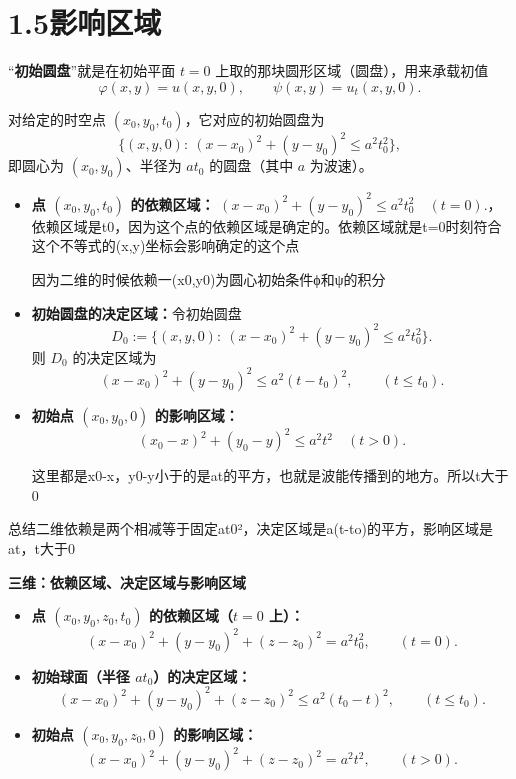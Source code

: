 \section{1.5影响区域}  
\begin{dxtips}
    “\textbf{初始圆盘}”就是在初始平面 $t=0$ 上取的那块圆形区域（圆盘），用来承载初值
\[
\varphi(x,y)=u(x,y,0),\qquad \psi(x,y)=u_t(x,y,0).
\]

对给定的时空点 $(x_0,y_0,t_0)$，它对应的初始圆盘为
\[
\{(x,y,0):\ (x-x_0)^2+(y-y_0)^2\le a^2t_0^2\},
\]
即圆心为 $(x_0,y_0)$、半径为 $a t_0$ 的圆盘（其中 $a$ 为波速）。
\end{dxtips}
\begin{itemize}
  \item \textbf{点 $(x_0,y_0,t_0)$ 的依赖区域：}
  $
  (x-x_0)^2+(y-y_0)^2\le a^2t_0^2 \quad (t=0). 
  $，依赖区域是t0，因为这个点的依赖区域是确定的。依赖区域就是t=0时刻符合这个不等式的(x,y)坐标会影响确定的这个点
\begin{dxtips}
    因为二维的时候依赖一(x0,y0)为圆心初始条件ϕ和ψ的积分
\end{dxtips}
  \item \textbf{初始圆盘的决定区域：}令初始圆盘
\[
D_0:=\{(x,y,0):\ (x-x_0)^2+(y-y_0)^2\le a^2t_0^2\}.
\]
则 $D_0$ 的决定区域为
\[
(x-x_0)^2+(y-y_0)^2\le a^2(t-t_0)^2,\qquad (t\le t_0). \tag{5.2}
\]

  \item \textbf{初始点 $(x_0,y_0,0)$ 的影响区域：}
  \[
  (x_0-x)^2+(y_0-y)^2\le a^2t^2 \quad (t>0). \tag{5.3}
  \]
  \begin{dxtips}
      这里都是x0-x，y0-y小于的是at的平方，也就是波能传播到的地方。所以t大于0
  \end{dxtips}
\end{itemize}
\begin{dxtips}
    总结二维依赖是两个相减等于固定at0²，决定区域是a(t-to)的平方，影响区域是at，t大于0
\end{dxtips}
\noindent\textbf{三维：依赖区域、决定区域与影响区域}
\begin{itemize}
  \item \textbf{点 $(x_0,y_0,z_0,t_0)$ 的依赖区域（$t=0$ 上）：}
  \[
  (x-x_0)^2+(y-y_0)^2+(z-z_0)^2 = a^2 t_0^2,\qquad (t=0). \tag{5.4}
  \]

  \item \textbf{初始球面（半径 $a t_0$）的决定区域：}
  \[
  (x-x_0)^2+(y-y_0)^2+(z-z_0)^2 \le a^2 (t_0-t)^2,\qquad (t\le t_0). \tag{5.5}
  \]

  \item \textbf{初始点 $(x_0,y_0,z_0,0)$ 的影响区域：}
  \[
  (x-x_0)^2+(y-y_0)^2+(z-z_0)^2 = a^2 t^2,\qquad (t>0). \tag{5.6}
  \]
\end{itemize}
